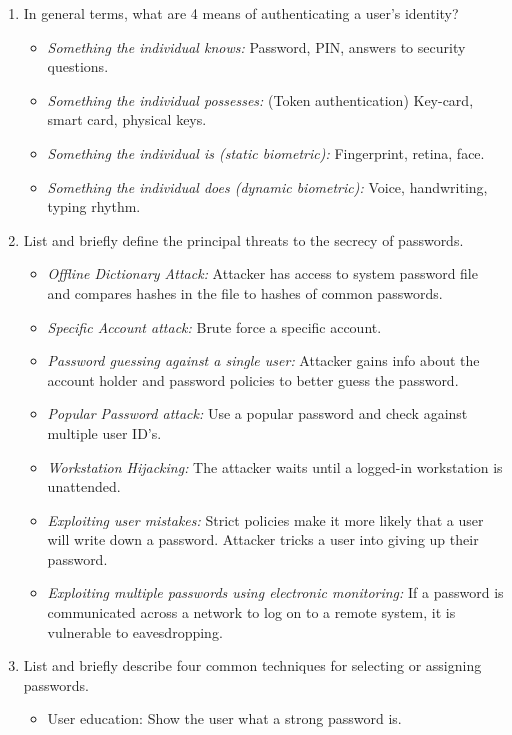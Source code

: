 \documentclass[12pt]{article}
\begin{document}
	\begin{enumerate}[label=Q3.\arabic*]
		\item In general terms, what are 4 means of authenticating a user's identity?
			\begin{itemize}
				\item \textit{Something the individual knows:} Password, PIN, answers to security questions.
				\item \textit{Something the individual possesses:} (Token authentication) Key-card, smart card, physical keys.
				\item \textit{Something the individual is (static biometric):} Fingerprint, retina, face.
				\item \textit{Something the individual does (dynamic biometric):} Voice, handwriting, typing rhythm.
			\end{itemize}
		\item List and briefly define the principal threats to the secrecy of passwords.
			\begin{itemize}
				\item \textit{Offline Dictionary Attack:} Attacker has access to system password file and compares hashes in the file to hashes of common passwords.
				\item \textit{Specific Account attack:} Brute force a specific account.
				\item \textit{Password guessing against a single user:} Attacker gains info about the account holder and password policies to better guess the password.
				\item \textit{Popular Password attack:} Use a popular password and check against multiple user ID's.
				\item \textit{Workstation Hijacking:} The attacker waits until a logged-in workstation is unattended.
				\item \textit{Exploiting user mistakes:} Strict policies make it more likely that a user will write down a password. Attacker tricks a user into giving up their password.
				\item \textit{Exploiting multiple passwords using electronic monitoring:} If a password is communicated across a network to log on to a remote system, it is vulnerable to eavesdropping.
			\end{itemize}
		\item List and briefly describe four common techniques for selecting or assigning passwords.
			\begin{itemize}
				\item User education: Show the user what a strong password is.

\end{itemize}
\end{enumerate}
\end{document}
